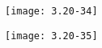 \begin{figure}[H] %
	\begin{minipage}{\linewidth}
		\texttt{[image: 3.20-34]}
	\end{minipage}
\end{figure}

\begin{figure}[H] %
	\begin{minipage}{\linewidth}
		\texttt{[image: 3.20-35]}
	\end{minipage}
\end{figure}











